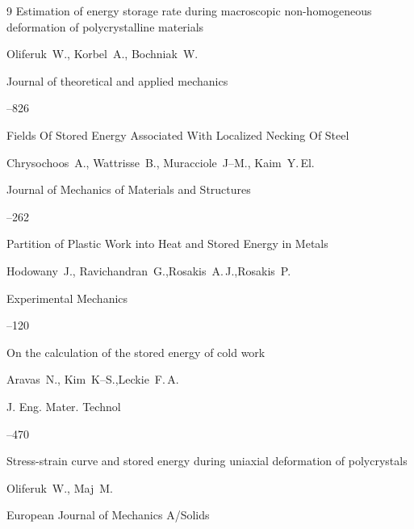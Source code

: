 \begin{thebibliography}{9}
\paper Estimation of energy storage rate during macroscopic non-homogeneous deformation of polycrystalline materials

\by  Oliferuk~W., Korbel~A., Bochniak~W.

\jour Journal of theoretical and applied mechanics



--826




\paper Fields Of Stored Energy Associated With Localized Necking Of Steel

\by  Chrysochoos~A., Wattrisse~B., Muracciole~J--M., Kaim~Y.\,El.

\jour Journal of Mechanics of Materials and Structures



--262




\paper Partition of Plastic Work into Heat and Stored Energy in Metals

\by  Hodowany~J., Ravichandran~G.,Rosakis~A.\,J.,Rosakis~P.

\jour Experimental Mechanics



--120




\paper On the calculation of the stored energy of cold work

\by  Aravas~N., Kim~K--S.,Leckie~F.\,A.

\jour J. Eng. Mater. Technol



--470




\paper Stress-strain curve and stored energy during uniaxial deformation of  polycrystals

\by  Oliferuk~W., Maj~M.

\jour European Journal of Mechanics A/Solids




\end{thebibliography}

